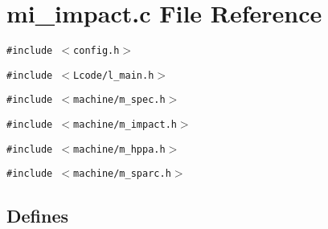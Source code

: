 \section{mi\_\-impact.c File Reference}
\label{mi__impact_8c}
{\tt \#include $<$config.h$>$}\par
{\tt \#include $<$Lcode/l\_\-main.h$>$}\par
{\tt \#include $<$machine/m\_\-spec.h$>$}\par
{\tt \#include $<$machine/m\_\-impact.h$>$}\par
{\tt \#include $<$machine/m\_\-hppa.h$>$}\par
{\tt \#include $<$machine/m\_\-sparc.h$>$}\par
\subsection*{Defines}
